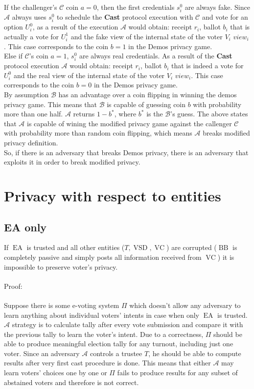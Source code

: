 \documentclass[12pt]{article}
\DeclareMathOperator{\vsd}{VSD}
\DeclareMathOperator{\ea}{EA}
\DeclareMathOperator{\bb}{BB}
\DeclareMathOperator{\voc}{VC}
\begin{document}
 If the challenger's  $\mathcal{C}$ coin $a=0$, then the first credentials $s^0_i$ are always fake. Since $\mathcal{A}$ always uses $s^0_i$ to schedule the \textbf{Cast} protocol execution with $\mathcal{C}$ and vote for an option $U^0_i$, as a result of the execution $\mathcal{A}$ would obtain: receipt $r_i$, ballot $b_i$ that is actually a vote for $U^1_i$  and the fake view of the internal state of the voter $V_i$ $view_i$. This case corresponds to the coin $b=1$ in the Demos privacy game. \\
 Else if $\mathcal{C}$'s coin $a=1$, $s^0_i$ are always real credentials. As a result of the \textbf{Cast}  protocol execution $\mathcal{A}$ would obtain: receipt $r_i$, ballot $b_i$ that is indeed a vote for $U^0_i$  and the real view of the internal state of the voter $V_i$ $view_i$. This case corresponds to the coin $b=0$ in the Demos privacy game.\\
By assumption $\mathcal{B}$ has an advantage over a coin flipping in winning the demos privacy game. This means that  $\mathcal{B}$ is capable of guessing coin $b$ with probability more than one half.  $\mathcal{A}$ returns $1-b^*$, where $b^*$ is the $\mathcal{B}$'s guess. The above states that $\mathcal{A}$ is capable of wining the modified privacy game against  the callenger $\mathcal{C}$ with probability more than random coin flipping, which means $\mathcal{A}$ breaks modified privacy definition. \\

So, if there is an adversary that breaks Demos privacy, there is an adversary that exploits it in order to  break modified privacy. 

%
%
\section{Privacy with respect to entities}
\subsection{EA only}
If $\ea$ is trusted and all other entities ($T,\vsd,\voc$) are corrupted ($\bb$ is completely passive and simply posts all information received from $\voc$) it is impossible to preserve voter's privacy. \\\\
Proof:\\\\
Suppose there is some e-voting system $\Pi$ which doesn't allow any adversary to learn anything about individual voters' intents in case when only $\ea$ is trusted. $\mathcal{A}$ strategy is to calculate tally after every vote submission and compare it with the previous tally to learn the voter's intent. Due to a correctness, $\Pi$ should be able to produce meaningful election tally for any turnout, including just one voter. Since an adversary $\mathcal{A}$ controls a trustee $T$, he should be able to compute results after very first cast procedure is done. This means that either $\mathcal{A}$  may learn voters' choices one by one or $\Pi$ fails to produce results for any subset of abstained voters  and therefore is not correct. 
\end{document}
